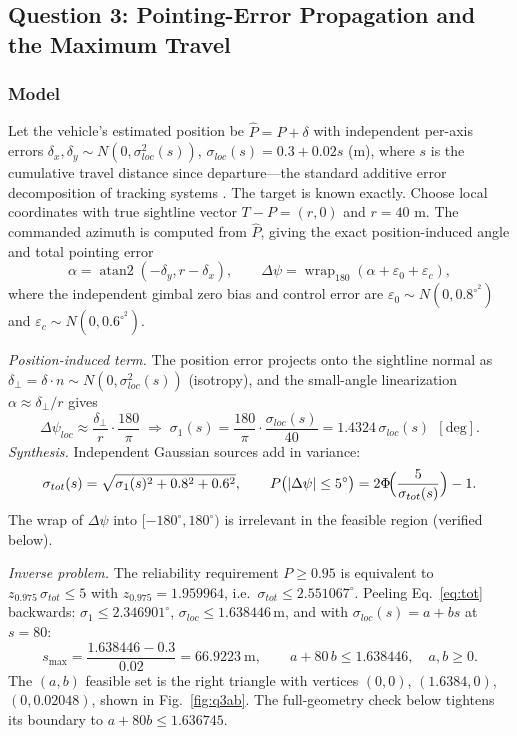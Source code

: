 \subsection{Question 3: Pointing-Error Propagation and the Maximum Travel}\label{sec:q3}

\subsubsection{Model}

Let the vehicle's estimated position be $\hat P=P+\delta$ with independent per-axis
errors $\delta_x,\delta_y\sim N(0,\sigma_{loc}^2(s))$,
$\sigma_{loc}(s)=0.3+0.02s$ (m), where $s$ is the cumulative travel distance since
departure---the standard additive error decomposition of tracking systems
\cite{barshalom2001}. The target is known exactly. Choose local coordinates with true
sightline vector $T-P=(r,0)$ and $r=40$ m. The commanded azimuth is computed from
$\hat P$, giving the exact position-induced angle and total pointing error
\begin{equation}\label{eq:exactgeom}
\alpha=\operatorname{atan2}(-\delta_y,r-\delta_x),\qquad
\Delta\psi=\operatorname{wrap}_{180}(\alpha+\varepsilon_0+\varepsilon_c),
\end{equation}
where the independent gimbal zero bias and control error are
$\varepsilon_0\sim N(0,0.8^{\circ^2})$ and
$\varepsilon_c\sim N(0,0.6^{\circ^2})$.

\emph{Position-induced term.} The position error projects onto the sightline normal as
$\delta_\perp=\delta\cdot n\sim N(0,\sigma_{loc}^2(s))$ (isotropy), and the small-angle
linearization $\alpha\approx\delta_\perp/r$ gives
\begin{equation}\label{eq:loc}
\Delta\psi_{loc}\approx\frac{\delta_\perp}{r}\cdot\frac{180}{\pi}
\;\Rightarrow\;
\sigma_1(s)=\frac{180}{\pi}\cdot\frac{\sigma_{loc}(s)}{40}
=1.4324\,\sigma_{loc}(s)\ \ [\text{deg}] .
\end{equation}
\emph{Synthesis.} Independent Gaussian sources add in variance:
\begin{equation}\label{eq:tot}
\sigma_{tot}(s)=\sqrt{\sigma_1(s)^{2}+0.8^{2}+0.6^{2}},\qquad
P\bigl(|\Delta\psi|\le5^\circ\bigr)=2\Phi\!\Bigl(\frac{5}{\sigma_{tot}(s)}\Bigr)-1 .
\end{equation}
The wrap of $\Delta\psi$ into $[-180^\circ,180^\circ)$ is irrelevant in the feasible
region (verified below).

\emph{Inverse problem.} The reliability requirement
$P\ge0.95$ is equivalent to $z_{0.975}\,\sigma_{tot}\le5$ with $z_{0.975}=1.959964$,
i.e.\ $\sigma_{tot}\le2.551067^\circ$. Peeling Eq.~\eqref{eq:tot} backwards:
$\sigma_1\le2.346901^\circ$, $\sigma_{loc}\le1.638446\,\mathrm{m}$, and with
$\sigma_{loc}(s)=a+bs$ at $s=80$:
\begin{equation}\label{eq:chain}
s_{\max}=\frac{1.638446-0.3}{0.02}=66.9223\ \mathrm{m},
\qquad
a+80\,b\le1.638446,\quad a,b\ge0 .
\end{equation}
The $(a,b)$ feasible set is the right triangle with vertices $(0,0)$, $(1.6384,0)$,
$(0,0.02048)$, shown in Fig.~\ref{fig:q3ab}. The full-geometry check below tightens its
boundary to $a+80b\le1.636745$.

